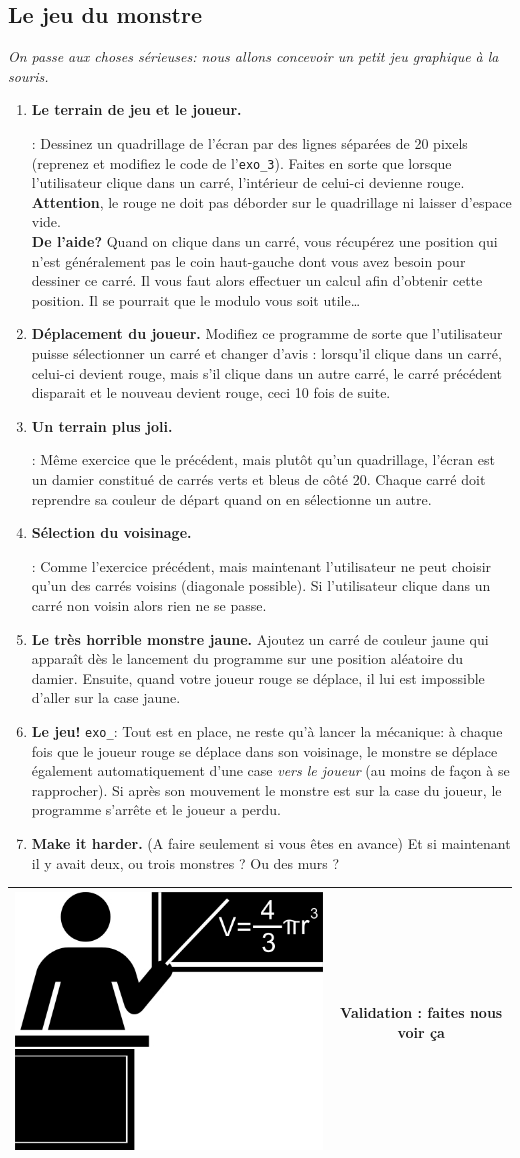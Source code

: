 \documentclass[11pt,a4paper]{article}
\newcommand{\checkbox}{$\square$ \smallskip}
\newcounter{exo} \setcounter{exo}{0}
\newenvironment{action}{%
    \begin{enumerate}[\numerotation] \addtocounter{exo}{-1}%
        }{%
    \end{enumerate}
}
\newcommand{\numexoa}{\theexo \addtocounter{exo}{1}}
\newcommand{\numerotation}{\checkbox \smallskip \numexoa.}
\newenvironment{validation}{%
\smallskip
\begin{tabular}{c|c}
    \hspace{.03\textwidth} \includegraphics[width=.07\textwidth]{img/teacher.jpg} & 
\begin{minipage}{.85\textwidth}
}{%
\end{minipage}\\
\hline
\end{tabular}
}
\newcounter{exoo} \setcounter{exoo}{0}
\newcommand{\numexo}{\theexoo}
\newcommand{\repexo}{{\tt exo_\numexo}}
\newcommand{\exoplus}{\addtocounter{exoo}{1}}
\begin{document}
\subsection*{Le jeu du monstre}
{\it On passe aux choses sérieuses: nous allons concevoir un petit jeu graphique à la souris.}
\begin{action}
\item {\bf Le terrain de jeu et le joueur. }\exoplus \repexo : Dessinez un quadrillage de l'écran par des lignes séparées de 20 pixels (reprenez et modifiez le code de l'{\tt exo_3}). Faites en sorte que lorsque l'utilisateur clique dans un carré, l'intérieur de celui-ci devienne rouge. {\bf Attention}, le rouge ne doit pas déborder sur le quadrillage ni laisser d'espace vide.\\
{\bf De l'aide?} Quand on clique dans un carré, vous récupérez une position qui n'est généralement pas le coin haut-gauche dont vous avez besoin pour dessiner ce carré. Il vous faut alors effectuer un calcul afin d'obtenir cette position. Il se pourrait que le modulo vous soit utile\dots
\item {\bf Déplacement du joueur.} Modifiez ce programme de sorte que l'utilisateur puisse \og sélectionner \fg un carré et changer d'avis : lorsqu'il clique dans un carré, celui-ci devient rouge, mais s'il clique dans un autre carré, le carré précédent disparait et le nouveau devient rouge, ceci 10 fois de suite.\\
\item {\bf Un terrain plus joli.} \exoplus \repexo : Même exercice que le précédent, mais plutôt qu'un quadrillage, l'écran est un damier constitué de carrés verts et bleus de côté 20. Chaque carré doit reprendre sa couleur de départ quand on en sélectionne un autre. \\
\item {\bf Sélection du voisinage.} \exoplus \repexo : Comme l'exercice précédent, mais maintenant l'utilisateur ne peut choisir qu'un des carrés voisins (diagonale possible). Si l'utilisateur clique dans un carré non voisin alors rien ne se passe.
\item {\bf Le très horrible monstre jaune.} Ajoutez un carré de couleur jaune qui apparaît dès le lancement du programme sur une position aléatoire du damier. Ensuite, quand votre joueur rouge se déplace, il lui est impossible d'aller sur la case jaune.
\item {\bf Le jeu!} \repexo:  Tout est en place, ne reste qu'à lancer la mécanique: à chaque fois que le joueur rouge se déplace dans son voisinage, le monstre se déplace également automatiquement d'une case \emph{vers le joueur} (au moins de façon à se rapprocher). Si après son mouvement le monstre est sur la case du  joueur, le programme s'arrête et le joueur a perdu.


\item {\bf Make it harder.} (A faire seulement si vous êtes en avance) Et si maintenant il y avait deux, ou trois monstres ? Ou des murs ?
\end{action}
\begin{validation}
    Validation : faites nous voir ça 
\end{validation}
\bigskip
\end{document}
